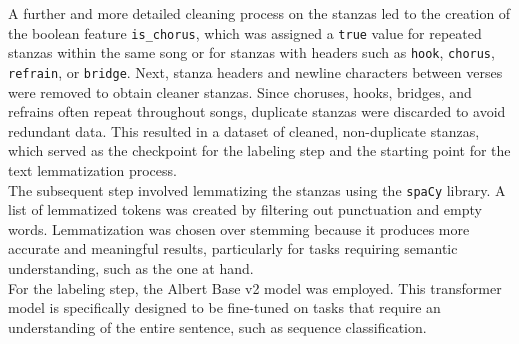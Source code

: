 A further and more detailed cleaning process on the stanzas led to the creation
of the boolean feature \texttt{is\_chorus}, which was assigned a \texttt{true}
value for repeated stanzas within the same song or for stanzas with headers such
as \texttt{hook}, \texttt{chorus}, \texttt{refrain}, or \texttt{bridge}.
Next, stanza headers and newline characters between verses were removed to obtain
cleaner stanzas.
Since choruses, hooks, bridges, and refrains often repeat throughout songs,
duplicate stanzas were discarded to avoid redundant data. This resulted in a
dataset of cleaned, non-duplicate stanzas, which served as the checkpoint for
the labeling step and the starting point for the text lemmatization process.\\

The subsequent step involved lemmatizing the stanzas using the \texttt{spaCy}
library. A list of lemmatized tokens was created by filtering out punctuation
and empty words. Lemmatization was chosen over stemming because it produces
more accurate and meaningful results, particularly for tasks requiring semantic
understanding, such as the one at hand.\\


For the labeling step, the Albert Base v2 model was employed. This
transformer model is specifically designed to be fine-tuned on tasks that
require an understanding of the entire sentence, such as sequence classification.\\
